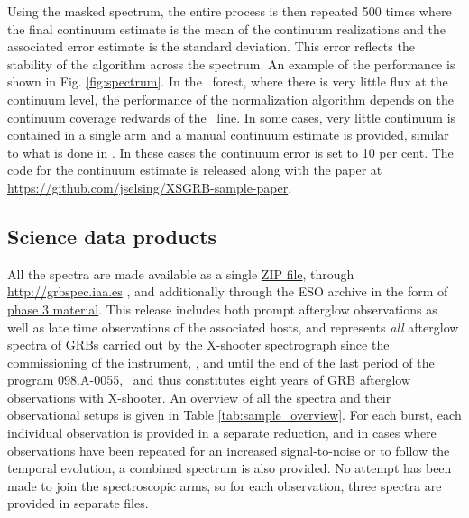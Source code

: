 \documentclass[longauth]{aa}    %
\begin{document}
Using the masked spectrum, the entire process is then repeated 500 times where
the final continuum estimate is the mean of the continuum realizations and the
associated error estimate is the standard deviation. This error reflects the
stability of the algorithm across the spectrum. An example of the performance is
shown in Fig. \ref{fig:spectrum}. In the \lya~forest, where there is very little
flux at the continuum level, the performance of the normalization algorithm
depends on the continuum coverage redwards of the \lya~line. In some cases, very
little continuum is contained in a single arm and a manual continuum estimate is
provided, similar to what is done in \citet{Lopez2016}. In these cases the
continuum error is set to 10 per cent. The code for the continuum estimate is
released along with the paper at
\url{https://github.com/jselsing/XSGRB-sample-paper}.
                                                                                           

\subsection{Science data products} \label{products}


All the spectra are made available as a single
\href{https://sid.erda.dk/cgi-sid/ls.py?share_id=DBuNORk1lI}{ZIP file}, through
\url{http://grbspec.iaa.es} \citep{DeUgartePostigo2014f}, and additionally through the ESO archive in the
form of \href{http://archive.eso.org/wdb/wdb/adp/phase3_main/form}{phase 3
	material}. This release includes both prompt afterglow observations as well as
late time observations of the associated hosts, and represents \textit{all}
afterglow spectra of GRBs carried out by the X-shooter spectrograph since the
commissioning of the instrument, \startdate, and until the end of the last
period of the program 098.A-0055, \termdate~and thus constitutes eight years of GRB
afterglow observations with X-shooter. An overview of all the spectra and their
observational setups is given in Table \ref{tab:sample_overview}. For each
burst, each individual observation is provided in a separate reduction, and in
cases where observations have been repeated for an increased signal-to-noise or
to follow the temporal evolution, a combined spectrum is also provided. No
attempt has been made to join the spectroscopic arms, so for each observation,
three spectra are provided in separate files.
\end{document}
